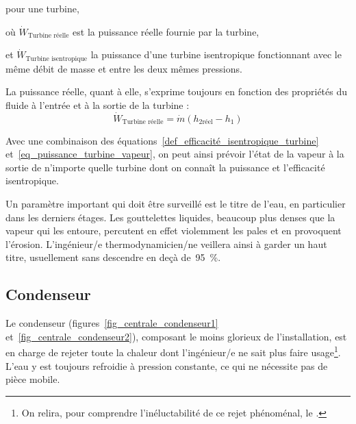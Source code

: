 		\begin{equationterms}
			\item pour une turbine,
			\item où \tab $\dot{W}_\text{Turbine réelle}$ \tab\tab\tab est la puissance réelle fournie par la turbine,
			\item et \tab $\dot{W}_\text{Turbine isentropique}$ \tab la puissance d’une turbine isentropique fonctionnant avec le même débit de masse et entre les deux mêmes pressions.
		\end{equationterms}

		La puissance réelle, quant à elle, s’exprime toujours en fonction des propriétés du fluide à l’entrée et à la sortie de la turbine :
		\begin{equation}
			\dot{W}_\text{Turbine réelle} = \dot{m} (h_{2 \text{réel}} - h_1)
			\label{eq_puissance_turbine_vapeur}
		\end{equation}

		Avec une combinaison des équations~\ref{def_efficacité_isentropique_turbine} et~\ref{eq_puissance_turbine_vapeur}, on peut ainsi prévoir l’état de la vapeur à la sortie de n’importe quelle turbine dont on connaît la puissance et l’efficacité isentropique.

		Un paramètre important qui doit être surveillé est le titre de l’eau, en particulier dans les derniers étages. Les gouttelettes liquides, beaucoup plus denses que la vapeur qui les entoure, percutent en effet violemment les pales et en provoquent l’érosion. L’ingénieur/e thermodynamicien/ne veillera ainsi à garder un haut titre, usuellement sans descendre en deçà de~\SI{95}{\percent}.


	\subsection{Condenseur}

		Le condenseur (figures~\ref{fig_centrale_condenseur1} et~\ref{fig_centrale_condenseur2}), composant le moins glorieux de l’installation, est en charge de rejeter toute la chaleur dont l’ingénieur/e ne sait plus faire usage\footnote{On relira, pour comprendre l’inéluctabilité de ce rejet phénoménal, le \courssept.}. L’eau y est toujours refroidie à pression constante, ce qui ne nécessite pas de pièce mobile.

